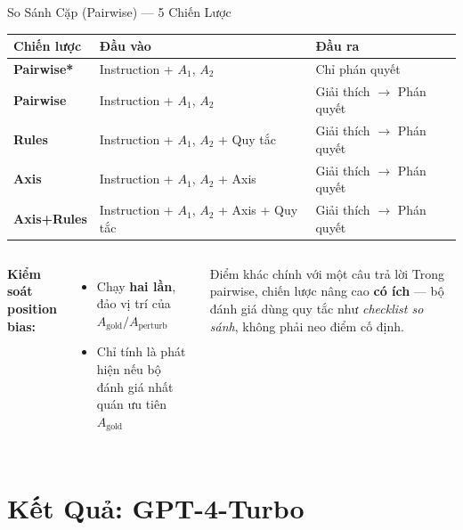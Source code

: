 \documentclass[aspectratio=169,10pt]{beamer}
\begin{document}
\begin{frame}{So Sánh Cặp (Pairwise) — 5 Chiến Lược}
  \begin{center}
  \small
  \begin{tabular}{llp{6cm}}
    \toprule
    \textbf{Chiến lược} & \textbf{Đầu vào} & \textbf{Đầu ra} \\
    \midrule
    \textbf{Pairwise*}  & Instruction + $A_1$, $A_2$ & Chỉ phán quyết \\
    \textbf{Pairwise}   & Instruction + $A_1$, $A_2$ & Giải thích $\to$ Phán quyết \\
    \textbf{Rules}      & Instruction + $A_1$, $A_2$ + Quy tắc & Giải thích $\to$ Phán quyết \\
    \textbf{Axis}       & Instruction + $A_1$, $A_2$ + Axis & Giải thích $\to$ Phán quyết \\
    \textbf{Axis+Rules} & Instruction + $A_1$, $A_2$ + Axis + Quy tắc & Giải thích $\to$ Phán quyết \\
    \bottomrule
  \end{tabular}
  \end{center}

  \vspace{0.5em}
  \begin{columns}[T]
      \textbf{Kiểm soát position bias:}
      \begin{itemize}
        \item Chạy \textbf{hai lần}, đảo vị trí của $A_{\text{gold}} / A_{\text{perturb}}$
        \item Chỉ tính là phát hiện nếu bộ đánh giá nhất quán ưu tiên $A_{\text{gold}}$
      \end{itemize}
      \begin{block}{Điểm khác chính với một câu trả lời}
        Trong pairwise, chiến lược nâng cao \textbf{có ích} — bộ đánh giá dùng quy tắc như \emph{checklist so sánh}, không phải neo điểm cố định.
      \end{block}
  \end{columns}
\end{frame}

\section{Kết Quả: GPT-4-Turbo}
\end{document}
